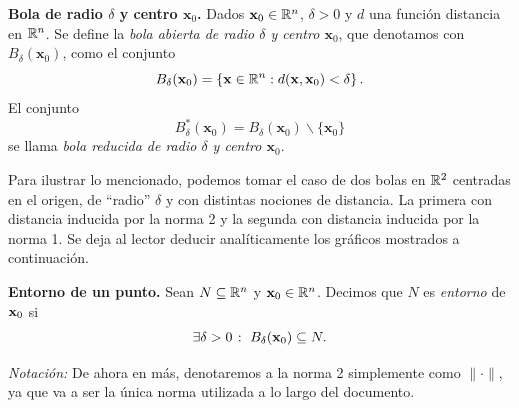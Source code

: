 \begin{definition}\label{def:bola} 
    \textbf{Bola de radio $\delta$ y centro $\mathbf{x}_0$.} 
    Dados $\mathbf{x}_0 \in \mathbb{R}^n$, $\delta > 0$ y $d$ una función distancia en $\mathbb{R}^n$.  Se define la \emph{bola abierta de radio $\delta$ y centro $\mathbf{x}_0$}, que denotamos con $B_{\delta}(\mathbf{x}_0)$, como el conjunto
    \[
     B_{\delta}(\mathbf{x}_0) = \left\lbrace \mathbf{x} \in \mathbb{R}^n : d(\mathbf{x},\mathbf{x}_0) < \delta \right\rbrace.
    \]
    El conjunto
    \[
     B^*_{\delta}(\mathbf{x}_0) = B_{\delta}(\mathbf{x}_0) \smallsetminus \{ \mathbf{x}_0 \}
    \]
    se llama \emph{bola reducida de radio $\delta$ y centro $\mathbf{x}_0$}.
\end{definition}

\begin{example}
    Para ilustrar lo mencionado, podemos tomar el caso de dos bolas en $\mathbb{R}^2$ centradas en el origen, de ``radio'' $\delta$ y con distintas nociones de distancia. La primera con distancia inducida por la norma 2 y la segunda con distancia inducida por la norma 1. Se deja al lector deducir anal\'iticamente los gr\'aficos mostrados a continuaci\'on. 

\end{example}



  \begin{definition} \textbf{Entorno de un punto.} \label{def:entorno}
    Sean $N  \subseteq   \mathbb{R}^n$ y $\vect{x}_0 \in \Rn{n}$. Decimos que $N$ es \emph{entorno} de $\vect{x}_0$ si
    \[
     \exists \delta > 0 \; \colon \; B_{\delta}(\vect{x}_0)  \subseteq  N.
    \]
   \end{definition}

 \emph{Notaci\'on:} De ahora en m\'as, denotaremos a la norma 2 simplemente como $\|\cdot\|$, ya que va a ser la \'unica norma utilizada a lo largo del documento.
   